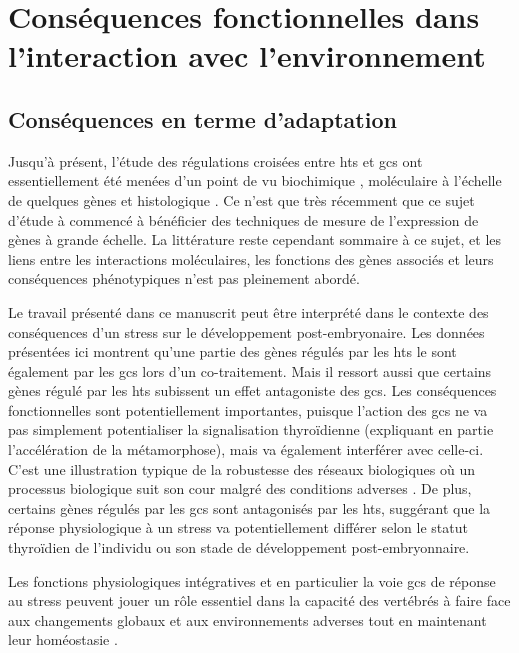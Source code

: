 \documentclass[../main.tex]{subfiles}
\begin{document}
\chapter{Conséquences fonctionnelles dans l'interaction avec l'environnement}


\section{Conséquences en terme d'adaptation}

Jusqu'à présent, l'étude des régulations croisées entre \glspl{ht} et \glspl{gc} ont essentiellement été menées d'un point de vu biochimique \citep{Kikuyama1982,Galton1990}, moléculaire à l’échelle de quelques gènes \citep{Bagamasbad2008,Krain2004} et histologique \citep{Denver1993}.
Ce n’est que très récemment que ce sujet d'étude à commencé à bénéficier des techniques de mesure de l'expression de gènes à grande échelle.
La littérature reste cependant sommaire à ce sujet, et les liens entre les interactions moléculaires, les fonctions des gènes associés et leurs conséquences phénotypiques n'est pas pleinement abordé.
\par
Le travail présenté dans ce manuscrit peut être interprété dans le contexte des conséquences d'un stress sur le développement post-embryonaire.
Les données présentées ici montrent qu'une partie des gènes régulés par les \glspl{ht} le sont également par les \glspl{gc} lors d'un co-traitement.
Mais il ressort aussi que certains gènes régulé par les \glspl{ht} subissent un effet antagoniste des \glspl{gc}.
Les conséquences fonctionnelles sont potentiellement importantes, puisque l'action des \glspl{gc} ne va pas simplement potentialiser la signalisation thyroïdienne (expliquant en partie l'accélération de la métamorphose), mais va également interférer avec celle-ci.
C'est une illustration typique de la robustesse des réseaux biologiques où un processus biologique suit son cour malgré des conditions adverses \citep{Kitano2004}.
De plus, certains gènes régulés par les \glspl{gc} sont antagonisés par les \glspl{ht}, suggérant que la réponse physiologique à un stress va potentiellement différer selon le statut thyroïdien de l'individu ou son stade de développement post-embryonnaire.
\par
Les fonctions physiologiques intégratives et en particulier la voie \glspl{gc} de réponse au stress peuvent jouer un rôle essentiel dans la capacité des vertébrés à faire face aux changements globaux et aux environnements adverses tout en maintenant leur homéostasie \citep{Angelier2013}.
\end{document}
